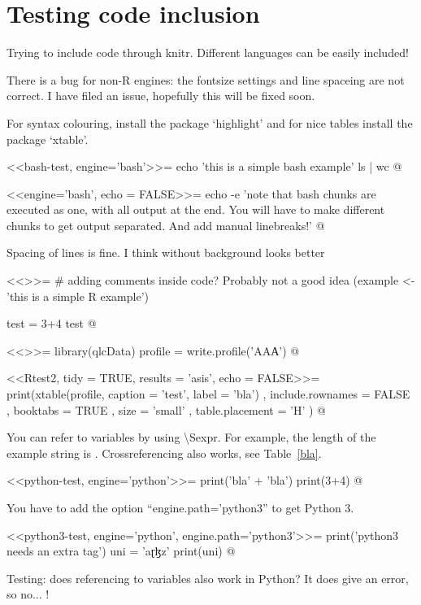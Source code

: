 \chapter{Testing code inclusion}


Trying to include code through knitr. 
Different languages can be easily 
included!

There is a bug for non-R engines: the fontsize settings and line spaceing are not correct. I have 
filed an issue, hopefully this will be fixed soon. 

For syntax colouring, install the package `highlight' and for nice tables 
install the package `xtable'.

<<bash-test, engine='bash'>>=
echo 'this is a simple bash example'
ls | wc
@

<<engine='bash', echo = FALSE>>=
echo -e 'note that bash chunks are executed as one, with all output at the end.
You will have to make different chunks to get output separated.
And add manual linebreaks!'
@

Spacing of lines is fine. I think without background looks better

<<>>=
# adding comments inside code? Probably not a good idea
(example <- 'this is a simple R example')

test = 3+4
test
@

<<>>=
library(qlcData) 
profile = write.profile('AΑА')
@

<<Rtest2, tidy = TRUE, results = 'asis', echo = FALSE>>=
print(xtable(profile, caption = 'test', label = 'bla')
  , include.rownames = FALSE
  , booktabs = TRUE
  , size = 'small'
  , table.placement = 'H'
  )
@



You can refer to variables by using \textbackslash Sexpr{}. 
For example, the length of the example string is .
Crossreferencing also works, see Table~\ref{bla}.

<<python-test, engine='python'>>=
print('bla' + 'bla')
print(3+4)
@

You have to add the option ``engine.path='python3'' to get Python 3.

<<python3-test, engine='python', engine.path='python3'>>=
print('python3 needs an extra tag')
uni = 'aɽɮz'
print(uni)
@

Testing: does referencing to variables also work in Python? It does give an error, so no... !